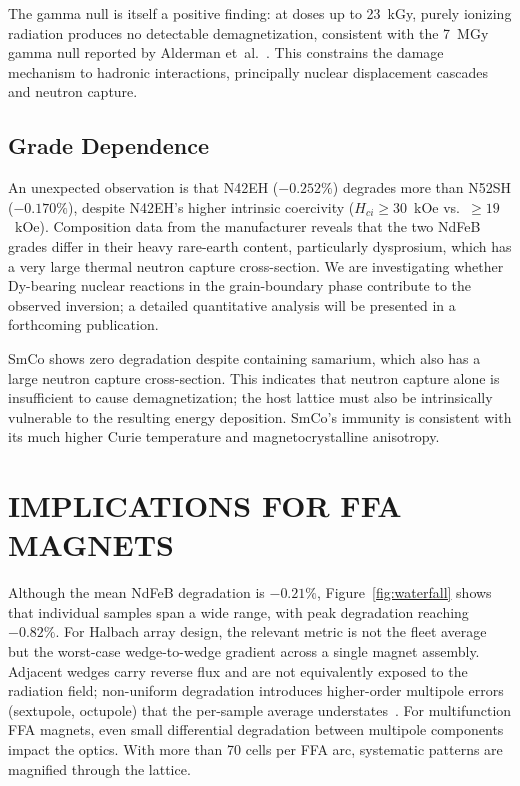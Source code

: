 \documentclass[a4paper,
               ]{jacow}
\begin{document}
The gamma null is itself a positive finding: at doses up to 23~kGy, purely ionizing radiation produces no detectable demagnetization, consistent with the 7~MGy gamma null reported by Alderman et~al.~\cite{Alderman:ANL}. This constrains the damage mechanism to hadronic interactions, principally nuclear displacement cascades and neutron capture.

\subsection{Grade Dependence}

An unexpected observation is that N42EH ($-0.252\%$) degrades more than N52SH ($-0.170\%$), despite N42EH's higher intrinsic coercivity ($H_{ci} \geq 30$~kOe vs.\ ${\geq}19$~kOe). Composition data from the manufacturer reveals that the two NdFeB grades differ in their heavy rare-earth content, particularly dysprosium, which has a very large thermal neutron capture cross-section. We are investigating whether Dy-bearing nuclear reactions in the grain-boundary phase contribute to the observed inversion; a detailed quantitative analysis will be presented in a forthcoming publication.

SmCo shows zero degradation despite containing samarium, which also has a large neutron capture cross-section. This indicates that neutron capture alone is insufficient to cause demagnetization; the host lattice must also be intrinsically vulnerable to the resulting energy deposition. SmCo's immunity is consistent with its much higher Curie temperature and magnetocrystalline anisotropy.

\section{IMPLICATIONS FOR FFA MAGNETS}

Although the mean NdFeB degradation is $-0.21\%$, Figure~\ref{fig:waterfall} shows that individual samples span a wide range, with peak degradation reaching $-0.82\%$. For Halbach array design, the relevant metric is not the fleet average but the worst-case wedge-to-wedge gradient across a single magnet assembly. Adjacent wedges carry reverse flux and are not equivalently exposed to the radiation field; non-uniform degradation introduces higher-order multipole errors (sextupole, octupole) that the per-sample average understates~\cite{Brooks:IPAC23-WEPM128}. For multifunction FFA magnets, even small differential degradation between multipole components impact the optics. With more than 70 cells per FFA arc, systematic patterns are magnified through the lattice.
\end{document}
